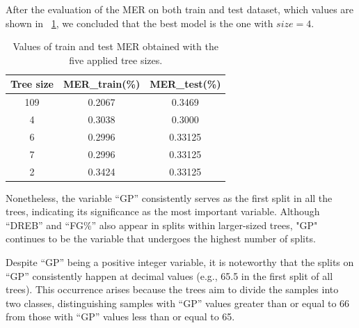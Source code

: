 After the evaluation of the MER on both train and test dataset, which values are shown in \Tab~\ref{table:TreesEvalParams}, we concluded that the best model is the one with $size = 4$.

\begin{table}[h]
	\centering
	\begin{tabular}{|| c | c | c ||}
		\hline 
		Tree size & MER\_train(\%) & MER\_test(\%) \\
		\hline
		\hline
		109 & 0.2067 & 0.3469 \\
		\hline
		4 & 0.3038 & 0.3000 \\
		\hline
		6 & 0.2996 & 0.33125 \\
		\hline
		7 & 0.2996 & 0.33125 \\
		\hline
		2 & 0.3424 & 0.33125 \\
		\hline
	\end{tabular}
	\caption{Values of train and test MER obtained with the five applied tree sizes.}
	\label{table:TreesEvalParams}
\end{table} 

Nonetheless, the variable ``GP'' consistently serves as the first split in all the trees, indicating its significance as the most important variable. Although ``DREB'' and ``FG\%'' also appear in splits within larger-sized trees, "GP" continues to be the variable that undergoes the highest number of splits.

Despite ``GP'' being a positive integer variable, it is noteworthy that the splits on ``GP'' consistently happen at decimal values (e.g., 65.5 in the first split of all trees). This occurrence arises because the trees aim to divide the samples into two classes, distinguishing samples with ``GP'' values greater than or equal to 66 from those with ``GP'' values less than or equal to 65.
